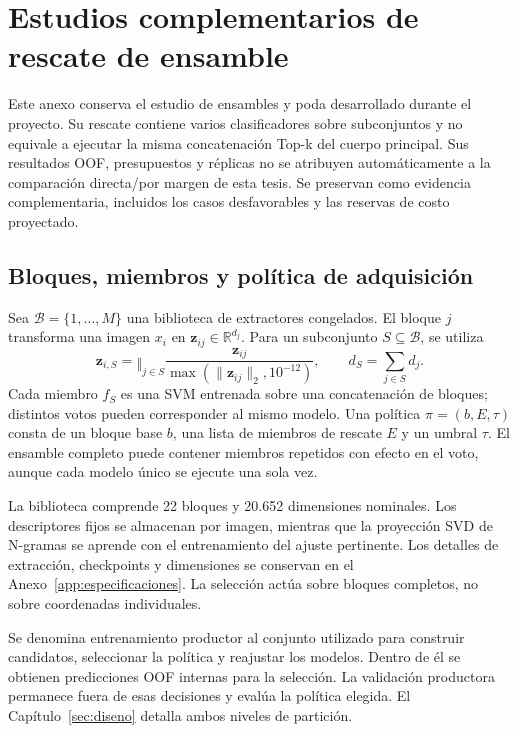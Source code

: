 \chapter{Estudios complementarios de rescate de ensamble}\label{app:complementarios}

Este anexo conserva el estudio de ensambles y poda desarrollado durante el proyecto. Su rescate contiene varios clasificadores sobre subconjuntos y no equivale a ejecutar la misma concatenación Top-k del cuerpo principal. Sus resultados OOF, presupuestos y réplicas no se atribuyen automáticamente a la comparación directa/por margen de esta tesis. Se preservan como evidencia complementaria, incluidos los casos desfavorables y las reservas de costo proyectado.


\section{Bloques, miembros y política de adquisición}
Sea $\mathcal B=\{1,\ldots,M\}$ una biblioteca de extractores congelados. El bloque $j$ transforma una imagen $x_i$ en $\mathbf z_{ij}\in\mathbb R^{d_j}$. Para un subconjunto $S\subseteq\mathcal B$, se utiliza
\begin{equation}
\mathbf z_{i,S}=\mathop{\Vert}_{j\in S}
\frac{\mathbf z_{ij}}{\max(\lVert\mathbf z_{ij}\rVert_2,10^{-12})},
\qquad d_S=\sum_{j\in S}d_j .
\label{eq:concat}
\end{equation}
Cada miembro $f_S$ es una SVM entrenada sobre una concatenación de bloques; distintos votos pueden corresponder al mismo modelo. Una política $\pi=(b,E,\tau)$ consta de un bloque base $b$, una lista de miembros de rescate $E$ y un umbral $\tau$. El ensamble completo puede contener miembros repetidos con efecto en el voto, aunque cada modelo único se ejecute una sola vez.

La biblioteca comprende 22 bloques y 20.652 dimensiones nominales. Los descriptores fijos se almacenan por imagen, mientras que la proyección SVD de N-gramas se aprende con el entrenamiento del ajuste pertinente. Los detalles de extracción, checkpoints y dimensiones se conservan en el Anexo~\ref{app:especificaciones}. La selección actúa sobre bloques completos, no sobre coordenadas individuales.

Se denomina entrenamiento productor al conjunto utilizado para construir candidatos, seleccionar la política y reajustar los modelos. Dentro de él se obtienen predicciones OOF internas para la selección. La validación productora permanece fuera de esas decisiones y evalúa la política elegida. El Capítulo~\ref{sec:diseno} detalla ambos niveles de partición.

